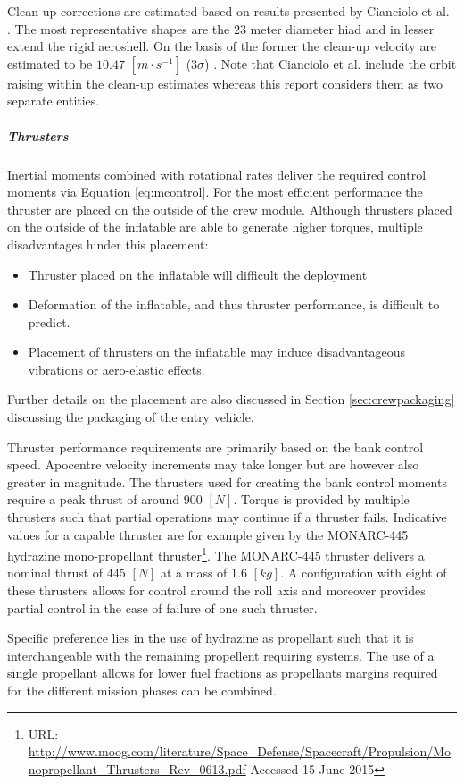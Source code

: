 Clean-up corrections are estimated based on results presented by Cianciolo et al. \cite{Cianciolo2010}. The most representative shapes are the $23$ meter diameter \gls{hiad} and in lesser extend the rigid aeroshell. On the basis of the former the clean-up velocity are estimated to be $10.47$ $[m\cdot s^{-1}]$ ($3\sigma$) \cite[p.37]{Cianciolo2010}. Note that Cianciolo et al. include the orbit raising within the clean-up estimates whereas this report considers them as two separate entities.


\subparagraph{Thrusters}
Inertial moments combined with rotational rates deliver the required control moments via Equation \ref{eq:mcontrol}. For the most efficient performance the thruster are placed on the outside of the crew module. Although thrusters placed on the outside of the inflatable are able to generate higher torques, multiple disadvantages hinder this placement:
\begin{itemize}
\item Thruster placed on the inflatable will difficult the deployment
\item Deformation of the inflatable, and thus thruster performance, is difficult to predict.
\item Placement of thrusters on the inflatable may induce disadvantageous vibrations or aero-elastic effects.  
\end{itemize} 

Further details on the placement are also discussed in Section \ref{sec:crewpackaging} discussing the packaging of the entry vehicle.

Thruster performance requirements are primarily based on the bank control speed. Apocentre velocity increments may take longer but are however also greater in magnitude. The thrusters used for creating the bank control moments require a peak thrust of around $900$ $[N]$. Torque is provided by multiple thrusters such that partial operations may continue if a thruster fails.
Indicative values for a capable thruster are for example given by the  MONARC-445 hydrazine mono-propellant thruster\footnote{URL: \url{http://www.moog.com/literature/Space\_Defense/Spacecraft/Propulsion/Monopropellant\_Thrusters\_Rev\_0613.pdf} Accessed 15 June 2015}. The MONARC-445 thruster delivers a nominal thrust of $445$ $[N]$ at a mass of 1.6 $[kg]$.  A configuration with eight of these thrusters allows for control around the roll axis and moreover provides partial control in the case of failure of one such thruster.
 
Specific preference lies in the use of hydrazine as propellant such that it is interchangeable with the remaining propellent requiring systems. The use of a single propellant allows for lower fuel fractions as propellants margins required for the different mission phases can be combined.

